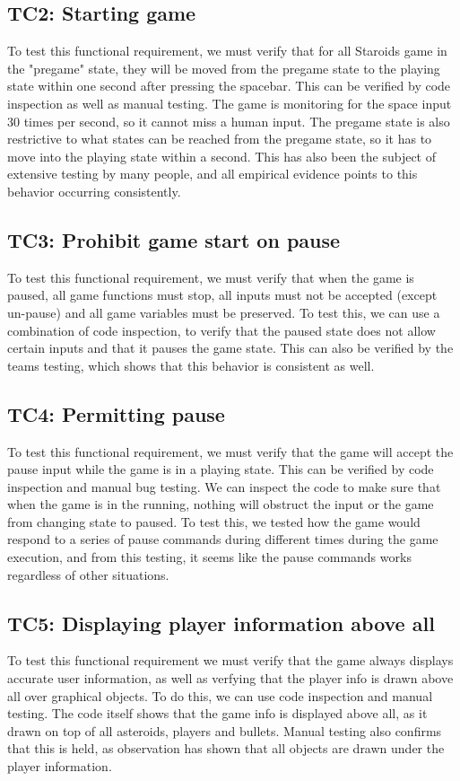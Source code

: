 \documentclass[12pt, titlepage]{article}
\begin{document}
\subsection{TC2: Starting game}
To test this functional requirement, we must verify that for all Staroids game in the "pregame" state,
they will be moved from the pregame state to the playing state within one second after pressing the spacebar.
This can be verified by code inspection as well as manual testing.
The game is monitoring for the space input 30 times per second, so it cannot miss a human input.
The pregame state is also restrictive to what states can be reached from the pregame state,
so it has to move into the playing state within a second.
This has also been the subject of extensive testing by many people,
and all empirical evidence points to this behavior occurring consistently.
\subsection{TC3: Prohibit game start on pause}
To test this functional requirement, we must verify that when the game is paused,
all game functions must stop, all inputs must not be accepted (except un-pause)
and all game variables must be preserved.
To test this, we can use a combination of code inspection,
to verify that the paused state does not allow certain inputs and that it pauses the game state.
This can also be verified by the teams testing, which shows that this behavior is consistent as well.
\subsection{TC4: Permitting pause}
To test this functional requirement, we must verify that the game will accept the pause input
while the game is in a playing state.
This can be verified by code inspection and manual bug testing.
We can inspect the code to make sure that when the game is in the running,
nothing will obstruct the input or the game from changing state to paused.
To test this, we tested how the game would respond to a series of pause commands during
different times during the game execution, and from this testing,
it seems like the pause commands works regardless of other situations.
\subsection{TC5: Displaying player information above all}
To test this functional requirement we must verify that the game always displays accurate user information, as well as verfying that the player info is drawn above all over graphical objects. To do this, we can use code inspection and manual testing. The code itself shows that the game info is displayed above all, as it drawn on top of all asteroids, players and bullets. Manual testing also confirms that this is held, as observation has shown that all objects are drawn under the player information.
\end{document}
